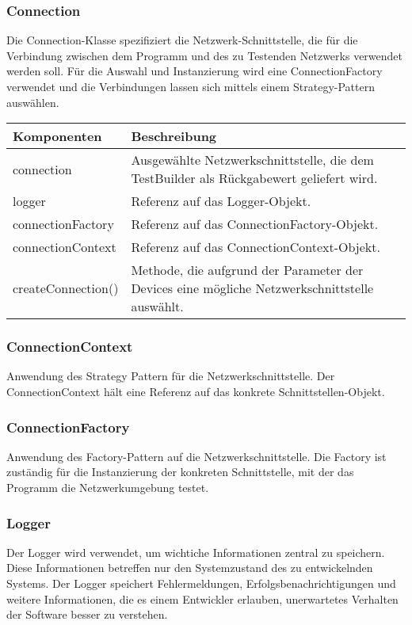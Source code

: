 \documentclass[
	ngerman,
	toc=listof, %
	toc=bibliography, %
	footnotes=multiple, %
	parskip=half, %
	numbers=noendperiod %
]{scrartcl}
\begin{document}
	\subsubsection{Connection}
	Die Connection-Klasse spezifiziert die Netzwerk-Schnittstelle, die für die Verbindung zwischen dem Programm und des zu Testenden Netzwerks verwendet werden soll.
	Für die Auswahl und Instanzierung wird eine ConnectionFactory verwendet und die Verbindungen lassen sich mittels einem Strategy-Pattern auswählen.

	\begin{tabularx}{\textwidth}{lX}
		\toprule
			Komponenten & Beschreibung \\
		\midrule
			connection & Ausgewählte Netzwerkschnittstelle, die dem TestBuilder als Rückgabewert geliefert wird. \\
			logger & Referenz auf das Logger-Objekt. \\
			connectionFactory & Referenz auf das ConnectionFactory-Objekt. \\
			connectionContext & Referenz auf das ConnectionContext-Objekt. \\
		\midrule
			createConnection() & Methode, die aufgrund der Parameter der Devices eine mögliche Netzwerkschnittstelle auswählt.\\
		\bottomrule
	\end{tabularx}

	\subsubsection{ConnectionContext}
	Anwendung des Strategy Pattern für die Netzwerkschnittstelle. 
	Der ConnectionContext hält eine Referenz auf das konkrete Schnittstellen-Objekt.

	\subsubsection{ConnectionFactory}
	Anwendung des Factory-Pattern auf die Netzwerkschnittstelle.
	Die Factory ist zuständig für die Instanzierung der konkreten Schnittstelle, mit der das Programm die Netzwerkumgebung testet.

	\subsubsection{Logger}
	Der Logger wird verwendet, um wichtiche Informationen zentral zu speichern. 
	Diese Informationen betreffen nur den Systemzustand des zu entwickelnden Systems.
	Der Logger speichert Fehlermeldungen, Erfolgsbenachrichtigungen und weitere Informationen, die es einem Entwickler erlauben, unerwartetes Verhalten der Software besser zu verstehen.
\end{document}
